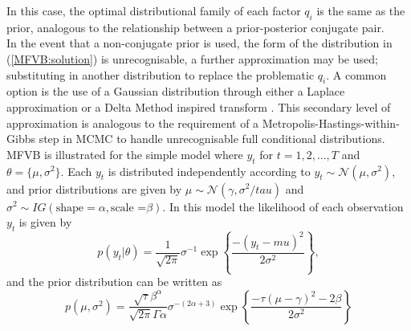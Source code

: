 \documentclass[
12pt, %
onehalfspacing, %
nohyperref, %
headsepline, %
chapterinoneline, %
]{MastersDoctoralThesis} %
\begin{document}
In this case, the optimal distributional family of each factor $q_i$ is the same as the prior, analogous to the relationship between a prior-posterior conjugate pair. 
\\

In the event that a non-conjugate prior is used, the form of the distribution in (\ref{MFVB:solution}) is unrecognisable, a further approximation may be used; substituting in another distribution to replace the problematic $q_i$. A common option is the use of a Gaussian distribution through either a Laplace approximation \citep{Friston2006} or a Delta Method inspired transform \citep{Wang2013}. This secondary level of approximation is analogous to the requirement of a Metropolis-Hastings-within-Gibbs step in MCMC to handle unrecognisable full conditional distributions.
\\

MFVB is illustrated for the simple model where $y_t$ for $t = 1, 2, \ldots, T$ and $\theta = \{\mu, \sigma^2\}$. Each $y_t$ is distributed independently according to  $y_t \sim \mathcal{N}(\mu, \sigma^2)$, and prior distributions are given by $\mu \sim \mathcal{N}(\gamma, \sigma^2 / tau)$ and $\sigma^2 \sim IG(\mbox{shape} = \alpha, \mbox{scale =}\beta)$. In this model the likelihood of each observation $y_t$ is given by
\begin{equation}
\label{MFVB:exampleLikelihood}
p(y_t | \theta) = \frac{1}{\sqrt{2 \pi}} \sigma^{-1}\exp\left\{ \frac{-(y_t - mu)^2}{2 \sigma^2} \right\},
\end{equation}
and the prior distribution can be written as
\begin{equation}
\label{MFVB:examplePrior}
p(\mu, \sigma^2) = \frac{\sqrt{\tau}\beta^{\alpha}}{\sqrt{2 \pi} \Gamma{\alpha}} \sigma^{-(2\alpha + 3)} \exp \left\{ \frac{-\tau (\mu - \gamma)^2 - 2\beta}{2 \sigma^2} \right\}
\end{equation}
\end{document}
